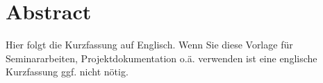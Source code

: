 \chapter*{Abstract}
\label{cha:Einleitung}
Hier folgt die Kurzfassung auf Englisch. Wenn Sie diese Vorlage für Seminararbeiten, Projektdokumentation o.ä. verwenden ist eine englische Kurzfassung ggf. nicht nötig.
